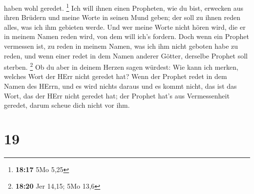 haben wohl geredet. \footnote{\textbf{18:17} 5Mo 5,25} 
Ich will ihnen einen Propheten, wie du bist, erwecken aus ihren Brüdern
und meine Worte in seinen Mund geben; der soll zu ihnen reden alles, was
ich ihm gebieten werde.  Und wer meine Worte nicht hören
wird, die er in meinem Namen reden wird, von dem will ich's fordern.
 Doch wenn ein Prophet vermessen ist, zu reden in meinem
Namen, was ich ihm nicht geboten habe zu reden, und wenn einer redet in
dem Namen anderer Götter, derselbe Prophet soll sterben. \footnote{\textbf{18:20}
  Jer 14,15; 5Mo 13,6}  Ob du aber in deinem Herzen sagen
würdest: Wie kann ich merken, welches Wort der HErr nicht geredet hat?
 Wenn der Prophet redet in dem Namen des HErrn, und es
wird nichts daraus und es kommt nicht, das ist das Wort, das der HErr
nicht geredet hat; der Prophet hat's aus Vermessenheit geredet, darum
scheue dich nicht vor ihm.

\hypertarget{section-18}{%
\section{19}\label{section-18}}

